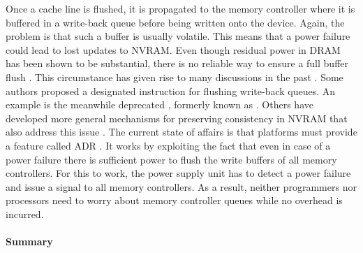 
Once a cache line is flushed, it is propagated to the memory controller where it
is buffered in a write-back queue before being written onto the device. Again,
the problem is that such a buffer is usually volatile. This means that a power
failure could lead to lost updates to NVRAM. Even though residual power in DRAM
has been shown to be substantial, there is no reliable way to ensure a full
buffer flush \cite{halderman2008lest}. This circumstance has given rise to many
discussions in the past \cite{condit2009better, dulloor2014system,
kolli2016high}. Some authors proposed a designated instruction for flushing
write-back queues. An example is the meanwhile deprecated ,
formerly known as  \cite{dulloor2014system, oukid2015instant,
schwalb2015nvm_malloc, volos2017whisper}. Others have developed more general
mechanisms for preserving consistency in NVRAM that also address this issue
\cite{condit2009better, pelley2014memory}. The current state of affairs is
that platforms must provide a feature called ADR \cite{volos2017whisper}. It
works by exploiting the fact that even in case of a power failure there is
sufficient power to flush the write buffers of all memory controllers. For this
to work, the power supply unit has to detect a power failure and issue a signal
to all memory controllers. As a result, neither programmers nor processors need to worry about memory controller queues while no overhead is incurred.


\paragraph{Summary}

